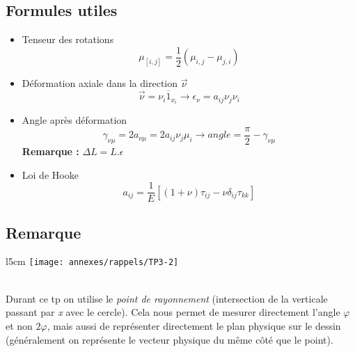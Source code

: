 \subsection*{Formules utiles}
\begin{itemize}
	\item Tenseur des rotations
	      \begin{equation}
	      	\mu _{[i,j]} = \frac{1}{2}(\mu _{i,j} - \mu _{j,i})
	      \end{equation}
	      		
	\item Déformation axiale dans la direction $\vec{\nu}$
	      \begin{equation}
	      	\vec{\nu} = \nu _i \overline{1}_{x_i} \rightarrow \epsilon _{\nu} = a_{ij} \nu _j \nu _i
	      \end{equation}
	      		
	\item	Angle après déformation 
	      \begin{equation}
	      	\gamma _{\nu \mu} = 2 a_{\nu \mu} = 2 a_{ij} \nu _j \mu _i \rightarrow angle = \frac{\pi}{2} - \gamma _{\nu \mu} 
	      \end{equation}
	      \textbf{Remarque :} $\Delta L = L.\epsilon$		
	\item Loi de Hooke
	      \begin{equation}
	      	a_{ij} = \frac{1}{E}[(1+\nu)\tau _{ij} - \nu \delta _{ij}\tau _{kk}]
	      \end{equation}							
\end{itemize}

\subsection*{Remarque}
\begin{wrapfigure}[7]{l}{5cm}
	\texttt{[image: annexes/rappels/TP3-2]}
\end{wrapfigure}
\ \\ Durant ce tp on utilise le \textit{point de rayonnement} (intersection de la verticale passant par \textit{x} avec le cercle). Cela nous permet de mesurer directement l'angle $\varphi$ et non $2 \varphi$, mais aussi de représenter directement le plan physique sur le dessin (généralement on représente le vecteur physique du même côté que le point).\\


